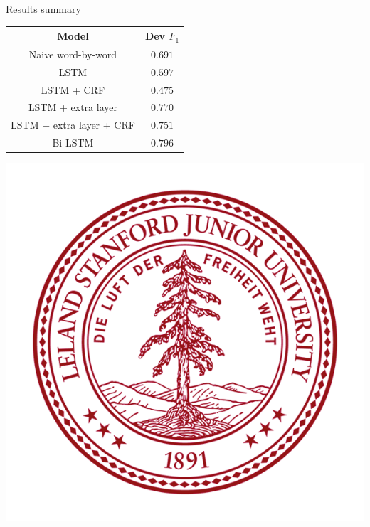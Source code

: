 \documentclass[final]{beamer}
\newlength{\onecolwid}
\begin{document}
\begin{frame}[t]
\begin{columns}[t]
\begin{column}{\onecolwid}



\begin{block}{Results summary}

\begin{center}
   \begin{tabular}{||c | c||}
   \hline
   Model  & Dev $F_1$ \\
   \hline\hline
   Naive word-by-word & $0.691$ \\
   \hline
   LSTM & $0.597$ \\
   \hline
   LSTM + CRF & $0.475$ \\
   \hline
   LSTM + extra layer & $0.770$ \\
   \hline
   LSTM + extra layer + CRF & $0.751$ \\
   \hline
   Bi-LSTM & $0.796$ \\ [1ex]
   \hline
  \end{tabular}
\end{center}


\begin{center}
    \includegraphics[scale=0.5]{figs/Stanford_logo}
\end{center}
\end{block}


\end{column}
\end{columns}
\end{frame}
\end{document}
